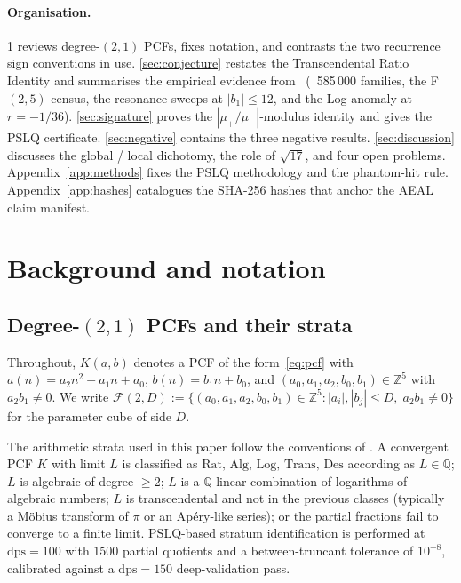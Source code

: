 \documentclass[11pt]{amsart}
\theoremstyle{definition}
\theoremstyle{remark}
\newcommand{\FF}{\mathcal{F}}
\newcommand{\Rat}{\mathrm{Rat}}
\newcommand{\Log}{\mathrm{Log}}
\newcommand{\Alg}{\mathrm{Alg}}
\newcommand{\Trans}{\mathrm{Trans}}
\newcommand{\Des}{\mathrm{Des}}
\newcommand{\dps}{\mathrm{dps}}
\newcommand{\Z}{\mathbb{Z}}
\newcommand{\Q}{\mathbb{Q}}
\begin{document}
\paragraph{Organisation.}
\textsection\ref{sec:background} reviews degree-$(2,1)$ PCFs,
fixes notation, and contrasts the two recurrence sign conventions
in use.  \textsection\ref{sec:conjecture} restates the Transcendental
Ratio Identity and summarises the empirical evidence
from~\cite{TRINote} (~585\,000 families, the F$(2,5)$ census, the
resonance sweeps at $|b_1|\le 12$, and the Log anomaly at $r=-1/36$).
\textsection\ref{sec:signature} proves the
$|\mu_+/\mu_-|$-modulus identity and gives the PSLQ certificate.
\textsection\ref{sec:negative} contains the three negative results.
\textsection\ref{sec:discussion} discusses the global / local
dichotomy, the role of $\sqrt{17}$, and four open problems.
Appendix~\ref{app:methods} fixes the PSLQ methodology and the
phantom-hit rule.  Appendix~\ref{app:hashes} catalogues the SHA-256
hashes that anchor the AEAL claim manifest.

\section{Background and notation}\label{sec:background}

\subsection{Degree-$(2,1)$ PCFs and their strata}

Throughout, $K(a,b)$ denotes a PCF of the form~\eqref{eq:pcf} with
$a(n) = a_2 n^2 + a_1 n + a_0$, $b(n) = b_1 n + b_0$, and
$(a_0,a_1,a_2,b_0,b_1) \in \Z^5$ with $a_2 b_1 \ne 0$.  We write
$\FF(2,D) := \{(a_0,a_1,a_2,b_0,b_1)\in\Z^5 : |a_i|,|b_j|\le D,\;
a_2 b_1\ne 0\}$ for the parameter cube of side $D$.

The arithmetic strata used in this paper follow the conventions of
\cite{TRINote, F25Census}.  A convergent PCF $K$ with limit $L$ is
classified as
\(
\Rat,\,\Alg,\,\Log,\,\Trans,\,\Des
\)
according as $L \in \Q$; $L$ is algebraic of degree $\ge 2$; $L$ is a
$\Q$-linear combination of logarithms of algebraic numbers; $L$ is
transcendental and not in the previous classes (typically a M\"obius
transform of $\pi$ or an Apéry-like series); or the partial fractions
fail to converge to a finite limit.  PSLQ-based stratum identification
is performed at $\dps = 100$ with $1500$ partial quotients and a
between-truncant tolerance of $10^{-8}$, calibrated against a
$\dps = 150$ deep-validation pass.
\end{document}

